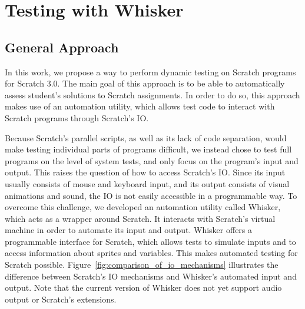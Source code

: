 \chapter{Testing with Whisker}
\label{cha:appraoch}

\section{General Approach}
\label{sec:general_appraoch}

In this work, we propose a way to perform dynamic testing on Scratch programs for Scratch 3.0.
The main goal of this approach is to be able to automatically assess student's solutions to Scratch assignments.
In order to do so, this approach makes use of an automation utility, which allows test code to
interact with Scratch programs through Scratch's IO.
\parspace

Because Scratch's parallel scripts, as well as its lack of code separation, would make testing individual parts of programs difficult,
we instead chose to test full programs on the level of system tests, and only focus on the program's input and output.
This raises the question of how to access Scratch's IO.
Since its input usually consists of mouse and keyboard input, and its output consists of visual animations and sound,
the IO is not easily accessible in a programmable way.
To overcome this challenge, we developed an automation utility called Whisker, which acts as a wrapper around Scratch.
It interacts with Scratch's virtual machine in order to automate its input and output.
Whisker offers a programmable interface for Scratch, which allows tests to simulate inputs and to access information about sprites and variables.
This makes automated testing for Scratch possible.
Figure~\ref{fig:comparison_of_io_mechanisms} illustrates the difference between Scratch's IO mechanisms and Whisker's automated input and output.
Note that the current version of Whisker does not yet support audio output or Scratch's extensions.

